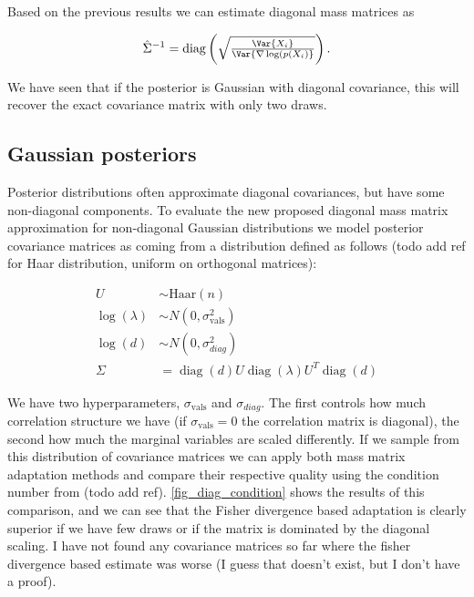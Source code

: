 \documentclass{scrartcl}
\DeclareMathOperator{\diag}{diag}
\begin{document}
Based on the previous results we can estimate diagonal mass matrices as

\[
\hat\Sigma^{-1} = \diag\left(\sqrt{\tfrac{\Var{X_i}}{\Var{\nabla \log(p(X_i)}}}\right).
\]

We have seen that if the posterior is Gaussian with diagonal covariance,
this will recover the exact covariance matrix with only two draws.

\subsection{Gaussian posteriors}

Posterior distributions often approximate diagonal covariances, but have some
non-diagonal components. To evaluate the new proposed diagonal mass matrix
approximation for non-diagonal Gaussian distributions we model posterior
covariance matrices as coming from a distribution defined as follows (todo add
ref for Haar distribution, uniform on orthogonal matrices):

\begin{align*}
U &\sim \text{Haar}(n) \\
\log(\lambda) &\sim N(0, \sigma_\text{vals}^2) \\
\log(d) &\sim N(0, \sigma_{diag}^2) \\
\Sigma &= \diag(d)U\diag(\lambda)U^T\diag(d)
\end{align*}

We have two hyperparameters, $\sigma_\text{vals}$ and $\sigma_{diag}$. The
first controls how much correlation structure we have (if $\sigma_\text{vals} =
0$ the correlation matrix is diagonal), the second how much the marginal
variables are scaled differently. If we sample from this distribution of
covariance matrices we can apply both mass matrix adaptation methods and
compare their respective quality using the condition number from (todo add
ref). \autoref{fig_diag_condition} shows the results of this comparison, and we
can see that the Fisher divergence based adaptation is clearly superior if we
have few draws or if the matrix is dominated by the diagonal scaling. I have
not found any covariance matrices so far where the fisher divergence based
estimate was worse (I guess that doesn't exist, but I don't have a proof).
\end{document}
